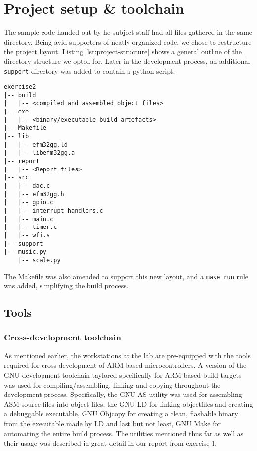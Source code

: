 \section{Project setup \& toolchain}

The sample code handed out by he subject staff had all files gathered in the same directory. Being avid supporters of neatly organized code, we chose to restructure the project layout. Listing \ref{lst:project-structure} shows a general outline of the directory structure we opted for. Later in the development process, an additional \texttt{support} directory was added to contain a python-script.

\begin{minipage}{\linewidth}
\begin{lstlisting}[label=lst:project-structure, caption=Revised project structure]
exercise2
|-- build
|   |-- <compiled and assembled object files>
|-- exe
|   |-- <binary/executable build artefacts>
|-- Makefile
|-- lib
|   |-- efm32gg.ld
|   |-- libefm32gg.a
|-- report
|   |-- <Report files>
|-- src
|   |-- dac.c
|   |-- efm32gg.h
|   |-- gpio.c
|   |-- interrupt_handlers.c
|   |-- main.c
|   |-- timer.c
|   |-- wfi.s
|-- support
|-- music.py
    |-- scale.py
\end{lstlisting}
\end{minipage}

The Makefile was also amended to support this new layout, and a \texttt{make run} rule was added, simplifying the build process.

\subsection{Tools}

\subsubsection{Cross-development toolchain}

As mentioned earlier, the workstations at the lab are pre-equipped with the tools required for cross-development of ARM-based microcontrollers. A version of the GNU development toolchain taylored specifically for ARM-based build targets was used for compiling/assembling, linking and copying throughout the development process. Specifically, the GNU AS \cite[p.~4]{exercise1report} utility was used for assembling ASM source files into object files, the GNU LD \cite[p.~4]{exercise1report} for linking objectfiles and creating a debuggable executable, GNU Objcopy \cite[p.~5]{exercise1report} for creating a clean, flashable binary from the executable made by LD and last but not least, GNU Make \cite[p.~5]{exercise1report} for automating the entire build process. The utilities mentioned thus far as well as their usage was described in great detail in our report from exercise 1.

